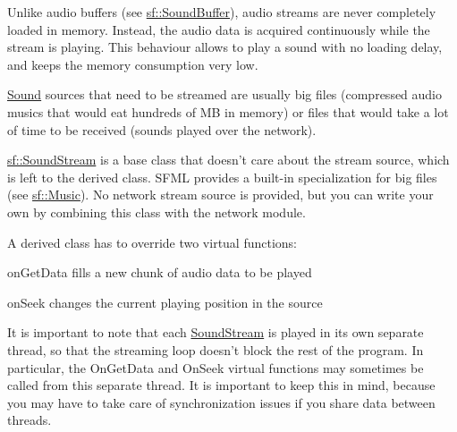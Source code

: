 Unlike audio buffers (see \hyperlink{classsf_1_1_sound_buffer}{sf\-::\-Sound\-Buffer}), audio streams are never completely loaded in memory. Instead, the audio data is acquired continuously while the stream is playing. This behaviour allows to play a sound with no loading delay, and keeps the memory consumption very low.

\hyperlink{classsf_1_1_sound}{Sound} sources that need to be streamed are usually big files (compressed audio musics that would eat hundreds of M\-B in memory) or files that would take a lot of time to be received (sounds played over the network).

\hyperlink{classsf_1_1_sound_stream}{sf\-::\-Sound\-Stream} is a base class that doesn't care about the stream source, which is left to the derived class. S\-F\-M\-L provides a built-\/in specialization for big files (see \hyperlink{classsf_1_1_music}{sf\-::\-Music}). No network stream source is provided, but you can write your own by combining this class with the network module.

A derived class has to override two virtual functions\-: \begin{DoxyItemize}
\item on\-Get\-Data fills a new chunk of audio data to be played \item on\-Seek changes the current playing position in the source\end{DoxyItemize}
It is important to note that each \hyperlink{classsf_1_1_sound_stream}{Sound\-Stream} is played in its own separate thread, so that the streaming loop doesn't block the rest of the program. In particular, the On\-Get\-Data and On\-Seek virtual functions may sometimes be called from this separate thread. It is important to keep this in mind, because you may have to take care of synchronization issues if you share data between threads.

